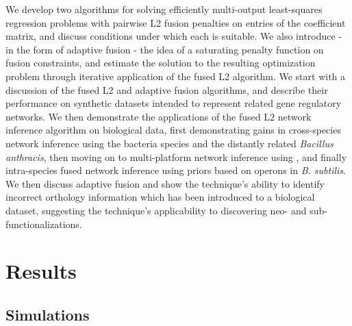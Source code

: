 \documentclass[11pt]{article}
\begin{document}

We develop two algorithms for solving efficiently multi-output least-squares regression problems with pairwise L2 fusion penalties on entries of the coefficient matrix, and discuss conditions under which each is suitable. We also introduce - in the form of adaptive fusion - the idea of a saturating penalty function on fusion constraints, and estimate the solution to the resulting optimization problem through iterative application of the fused L2 algorithm. We start with a discussion of the fused L2 and adaptive fusion algorithms, and describe their performance on synthetic datasets intended to represent related gene regulatory networks. We then demonstrate the applications of the fused L2 network inference algorithm on biological data, first demonstrating gains in cross-species network inference using the bacteria species  and the distantly related \textit{Bacillus anthracis}, then moving on to multi-platform network inference using , and finally intra-species fused network inference using priors based on operons in \textit{B. subtilis}. We then discuss adaptive fusion and show the technique's ability to identify incorrect orthology information which has been introduced to a biological dataset, suggesting the technique's applicability to discovering neo- and sub-functionalizations. 


\section{Results}

\subsection{Simulations}
\end{document}

